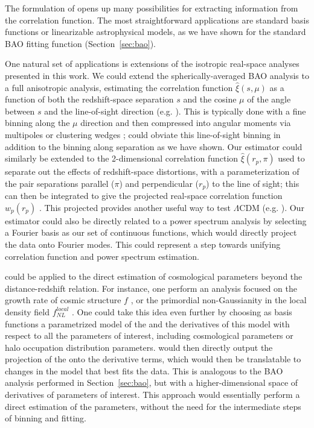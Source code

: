 The formulation of \est opens up many possibilities for extracting information from the correlation function.
The most straightforward applications are standard basis functions or linearizable astrophysical models, as we have shown for the standard BAO fitting function (Section~\ref{sec:bao}).

One natural set of applications is extensions of the isotropic real-space analyses presented in this work.
We could extend the spherically-averaged BAO analysis to a full anisotropic analysis, estimating the correlation function $\hat{\xi}(s, \mu)$ as a function of both the redshift-space separation $s$ and the cosine $\mu$ of the angle between $s$ and the line-of-sight direction (e.g. \citealt{Anderson2013}).
This is typically done with a fine binning along the $\mu$ direction and then compressed into angular moments via multipoles or clustering wedges \citep{Kazin2012}; \est could obviate this line-of-sight binning in addition to the binning along separation as we have shown.
Our estimator could similarly be extended to the 2-dimensional correlation function  $\hat{\xi}(r_p, \pi)$ used to separate out the effects of redshift-space distortions, with a parameterization of the pair separations parallel ($\pi$) and perpendicular ($r_p$) to the line of sight; this can then be integrated to give the projected real-space correlation function $w_p(r_p)$ \citep{DavisPeebles1983}.
This projected \cf provides another useful way to test $\Lambda$CDM (e.g. \citealt{Nuza2013}).
Our estimator could also be directly related to a power spectrum analysis by selecting a Fourier basis as our set of continuous functions, which would directly project the data onto Fourier modes.
This could represent a step towards unifying correlation function and power spectrum estimation.

\Est could be applied to the direct estimation of cosmological parameters beyond the distance-redshift relation.
For instance, one perform an analysis focused on the growth rate of cosmic structure $f$ \citep{Reid2014, Satpathy2016}, or the primordial non-Gaussianity in the local density field $f^{local}_{NL}$ \citep{Karagiannis2014}.
One could take this idea even further by choosing as basis functions a parametrized model of the \cf and the derivatives of this model with respect to all the parameters of interest, including cosmological parameters or halo occupation distribution parameters.
\Est would then directly output the projection of the \cf onto the derivative terms, which would then be translatable to changes in the  model that best fits the data.
This is analogous to the BAO analysis performed in Section~\ref{sec:bao}, but with a higher-dimensional space of derivatives of parameters of interest.
This approach would essentially perform a direct estimation of the parameters, without the need for the intermediate steps of binning and fitting.     

